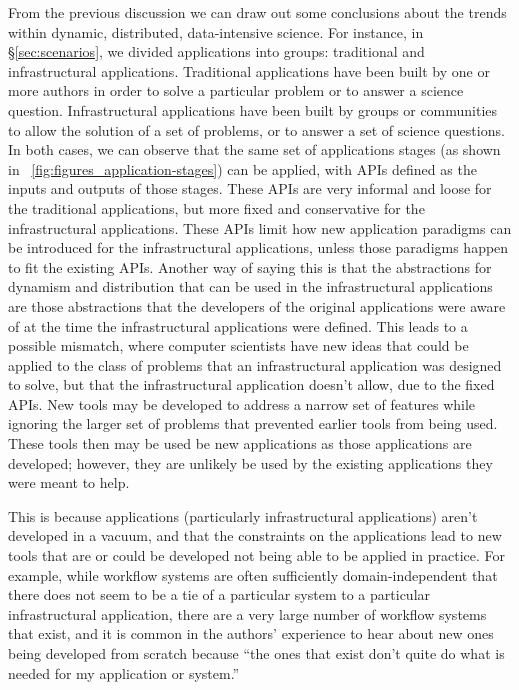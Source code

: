 From the previous discussion we can draw out some conclusions about
the trends within dynamic, distributed, data-intensive science. For
instance, in \S\ref{sec:scenarios}, we divided applications into
groups: traditional and infrastructural applications.  Traditional
applications have been built by one or more authors in order to solve
a particular problem or to answer a science question.  Infrastructural
applications have been built by groups or communities to allow the
solution of a set of problems, or to answer a set of science
questions.  In both cases, we can observe that the same set of
applications stages (as shown in
\figurename~\ref{fig:figures_application-stages}) can be applied, with
APIs defined as the inputs and outputs of those stages.  These APIs
are very informal and loose for the traditional applications, but more
fixed and conservative for the infrastructural applications.
These APIs limit how new application paradigms %
can be introduced for the infrastructural applications, unless those
paradigms happen to fit the existing APIs.  Another way of saying this
is that the abstractions for dynamism and distribution that can be
used in the infrastructural applications are those abstractions that
the developers of the original applications were aware of at the time
the infrastructural applications were defined.  This leads to a
possible mismatch, where computer scientists have new ideas that could
be applied to the class of problems that an infrastructural
application was designed to solve, but that the infrastructural
application doesn't allow, due to the fixed APIs.
New tools may be developed to address a
narrow set of features while ignoring the larger set of problems that
prevented earlier tools from being used.  These tools then may be used
be new applications as those applications are developed; however, they
are unlikely be used by the existing applications they were meant to
help.

This is because applications
(particularly infrastructural applications)
aren't developed in a vacuum, and that the constraints on the
applications lead to new tools that are or could be developed not
being able to be applied in practice.  For example, while
workflow systems are often sufficiently domain-independent that
there does not seem to be a tie of a particular system to a particular
infrastructural application, there are a very large number of workflow
systems that exist, and it is common in the authors' experience to
hear about new ones being developed from scratch because ``the
ones that exist don't quite do what is needed for my application or system.''

